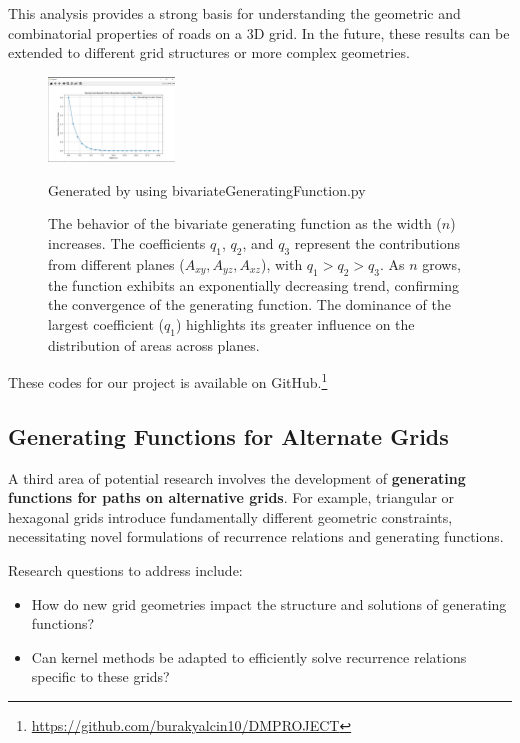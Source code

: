 \documentclass{article}
\begin{document}
This analysis provides a strong basis for understanding the geometric and combinatorial properties of roads on a 3D grid. In the future, these results can be extended to different grid structures or more complex geometries.

\begin{figure}[H]
\centering
\includegraphics[width=0.3\textwidth]{images/bivariate.jpg} %
                                
                Generated by using bivariateGeneratingFunction.py 
\caption{The behavior of the bivariate generating function as the width (\(n\)) increases. 
The coefficients \(q_1\), \(q_2\), and \(q_3\) represent the contributions from different planes (\(A_{xy}, A_{yz}, A_{xz}\)), with \(q_1 > q_2 > q_3\). 
As \(n\) grows, the function exhibits an exponentially decreasing trend, confirming the convergence of the generating function. 
The dominance of the largest coefficient (\(q_1\)) highlights its greater influence on the distribution of areas across planes.}
\label{fig:bivariate_generating_function}

\end{figure}
These codes for our project is available on GitHub.\footnote{\url{https://github.com/burakyalcin10/DMPROJECT}}



\subsection{Generating Functions for Alternate Grids}
A third area of potential research involves the development of \textbf{generating functions for paths on alternative grids}. For example, triangular or hexagonal grids introduce fundamentally different geometric constraints, necessitating novel formulations of recurrence relations and generating functions.



Research questions to address include:
\begin{itemize}
    \item How do new grid geometries impact the structure and solutions of generating functions?
    \item Can kernel methods be adapted to efficiently solve recurrence relations specific to these grids?
\end{itemize}
\end{document}
